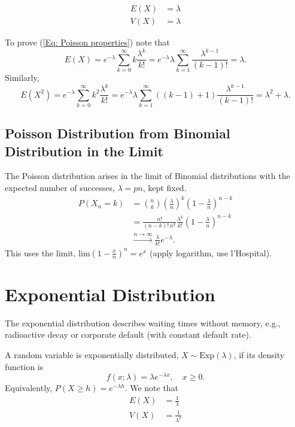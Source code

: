 \documentclass{article}
\begin{document}
\begin{equation}
\label{Eq: Poisson properties}
\begin{split}
E(X) &= \lambda \\
V(X) &= \lambda
\end{split}
\end{equation}

To prove (\ref{Eq: Poisson properties}) note that
\begin{equation*}
E(X) = e^{-\lambda} \sum_{k=0}^\infty k \frac{\lambda^k}{k!} = e^{-\lambda} \lambda \sum_{k=1}^\infty \frac{\lambda^{k-1}}{(k-1)!} = \lambda.
\end{equation*}
Similarly,
\begin{equation*}
E(X^2) = e^{-\lambda} \sum_{k=0}^\infty k^2 \frac{\lambda^k}{k!} = e^{-\lambda} \lambda \sum_{k=1}^\infty ((k-1) + 1) \frac{\lambda^{k-1}}{(k-1)!}
 = \lambda^2 + \lambda.
 \end{equation*}
 
 \subsection{Poisson Distribution from Binomial Distribution  in the Limit}
The Poisson distribution arises in the limit of Binomial distributions with the expected number of successes, $\lambda = pn$, kept fixed. 
\begin{equation*}
\begin{split}
P(X_n = k) &= {n \choose k} \left(\frac{\lambda}{n}\right)^k \left(1 - \frac{\lambda}{n}\right)^{n-k} \\
&= \frac{n!}{(n-k)! \, n^k} \frac{\lambda^k}{k!} \left(1 - \frac{\lambda}{n}\right)^{n-k} \\
& \xrightarrow {n \rightarrow \infty} \frac{\lambda}{k!} e^{-\lambda}.
\end{split}
\end{equation*}
This uses the limit, $\textrm{lim}(1-\frac{x}{n})^n = e^x$ (apply logarithm, use l'Hospital).

 
 \section{Exponential Distribution}
 The exponential distribution describes waiting times without memory, e.g., radioactive decay or corporate default (with constant default rate).
 
 A random variable is exponentially distributed, $X \sim \textrm{Exp}(\lambda)$, if its density function is
 \begin{equation*}
 f(x;\lambda) = \lambda e^{-\lambda x}, \quad x \geq 0.
 \end{equation*}
 Equivalently, $P(X \geq h) = e^{-\lambda h}$. We note that
 \begin{equation}
 \begin{split}
 E(X) &= \frac{1}{\lambda} \\
 V(X) &= \frac{1}{\lambda^2}
 \end{split}
 \end{equation} 
 
\end{document}
